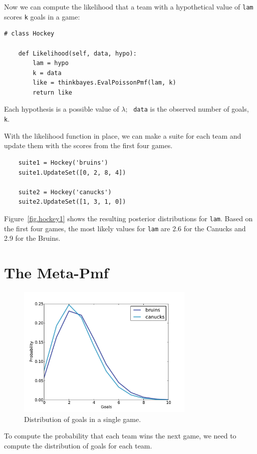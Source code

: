 \documentclass[12pt]{book}
\begin{document}
Now we can compute the likelihood that a team with a hypothetical
value of {\tt lam} scores {\tt k} goals in a game:

\begin{verbatim}
# class Hockey

    def Likelihood(self, data, hypo):
        lam = hypo
        k = data
        like = thinkbayes.EvalPoissonPmf(lam, k)
        return like
\end{verbatim}

Each hypothesis is a possible value of $\lambda$;  {\tt
  data} is the observed number of goals, {\tt k}.

With the likelihood function in place, we can make a suite for each
team and update them with the scores from the first four games.

\begin{verbatim}
    suite1 = Hockey('bruins')
    suite1.UpdateSet([0, 2, 8, 4])
     
    suite2 = Hockey('canucks')
    suite2.UpdateSet([1, 3, 1, 0])
\end{verbatim}  

Figure~\ref{fig.hockey1} shows the resulting posterior distributions
for {\tt lam}.  Based on the first four games, the most likely
values for {\tt lam} are 2.6 for the Canucks and 2.9 for the Bruins.


\section{The Meta-Pmf}
\label{meta-pmf}

\begin{figure}
\centerline{\includegraphics[height=2.5in]{figs/hockey2.pdf}}
\caption{Distribution of goals in a single game.}
\label{fig.hockey2}
\end{figure}

To compute the probability that each team wins the next game,
we need to compute the distribution of goals for each team.
\end{document}
